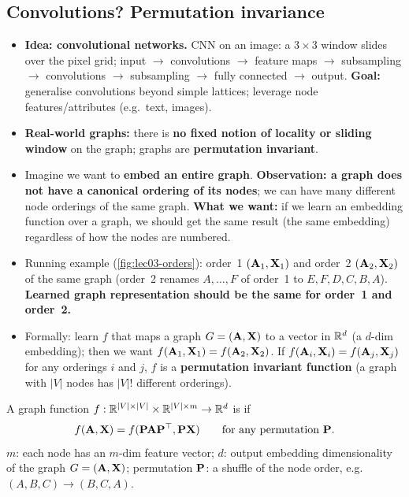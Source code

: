 \subsection{Convolutions? Permutation invariance}\label{sec:lec03-perm-inv}

\begin{itemize}
  \item \textbf{Idea: convolutional networks.} CNN on an image: a $3\times3$
    window slides over the pixel grid; input $\to$ convolutions $\to$ feature
    maps $\to$ subsampling $\to$ convolutions $\to$ subsampling $\to$ fully
    connected $\to$ output. \textbf{Goal:} generalise convolutions beyond
    simple lattices; leverage node features/attributes (e.g.\ text, images).
  \item \textbf{Real-world graphs:} there is \textbf{no fixed notion of
    locality or sliding window} on the graph; graphs are \textbf{permutation
    invariant}.
  \item Imagine we want to \textbf{embed an entire graph}.
    \textbf{Observation: a graph does not have a canonical ordering of its
    nodes}; we can have many different node orderings of the same graph.
    \textbf{What we want:} if we learn an embedding function over a graph,
    we should get the same result (the same embedding) regardless of how the
    nodes are numbered.
  \item Running example (\cref{fig:lec03-orders}): order~1 $(\mathbf{A}_1,\mathbf{X}_1)$ and
    order~2 $(\mathbf{A}_2,\mathbf{X}_2)$ of the same graph (order~2 renames $A,\dots,F$ of
    order~1 to $E,F,D,C,B,A$). \textbf{Learned graph representation should be
    the same for order~1 and order~2.}
  \item Formally: learn $f$ that maps a graph $G=(\mathbf{A},\mathbf{X})$ to a vector in
    $\mathbb{R}^d$ (a $d$-dim embedding); then we want
    $f(\mathbf{A}_1,\mathbf{X}_1) = f(\mathbf{A}_2,\mathbf{X}_2)$. If $f(\mathbf{A}_i,\mathbf{X}_i)=f(\mathbf{A}_j,\mathbf{X}_j)$ for
    any orderings $i$ and $j$, $f$ is a \textbf{permutation invariant
    function} (a graph with $|V|$ nodes has $|V|!$ different orderings).
\end{itemize}

\begin{definition}\label{def:lec03-perm-inv}
  A graph function $f:\mathbb{R}^{|V|\times|V|}\times\mathbb{R}^{|V|\times m}\to\mathbb{R}^{d}$ is
   if
  \begin{equation}\label{eq:lec03-perm-inv}
    f(\mathbf{A},\mathbf{X}) = f(\mathbf{P}\mathbf{A}\mathbf{P}^{\top},\mathbf{P}\mathbf{X})\qquad\text{for any permutation } \mathbf{P} .
  \end{equation}
  $m$: each node has an $m$-dim feature vector; $d$: output embedding
  dimensionality of the graph $G=(\mathbf{A},\mathbf{X})$; permutation $\mathbf{P}$: a shuffle of
  the node order, e.g.\ $(A,B,C)\to(B,C,A)$.
\end{definition}

